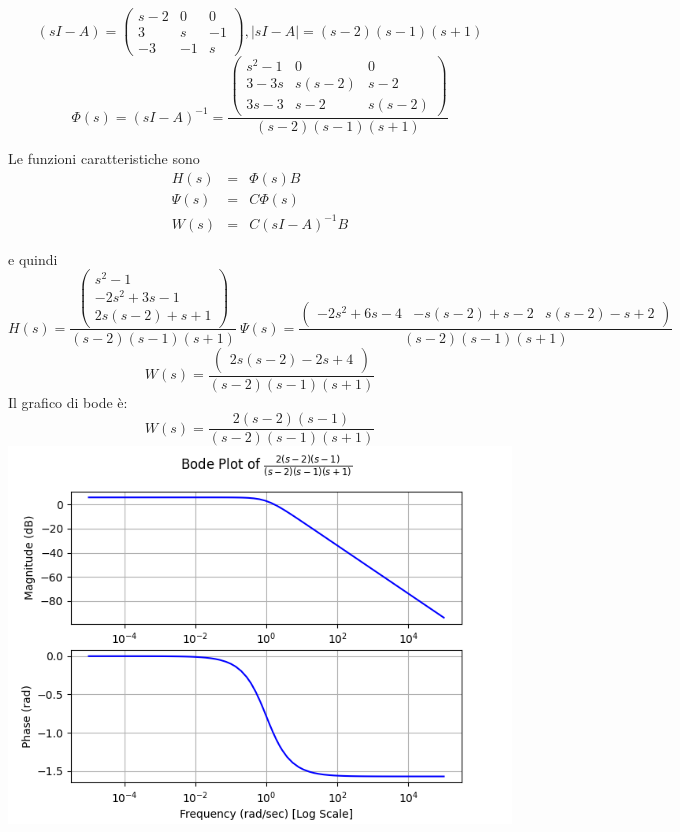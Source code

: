 \documentclass{article}
\begin{document}
\[ (sI-A) = \left(\begin{matrix}s - 2 & 0 & 0\\3 & s & -1\\-3 & -1 & s\end{matrix}\right), |sI-A| = \left(s - 2\right) \left(s - 1\right) \left(s + 1\right) \]
\[ \Phi(s) = (sI-A)^{-1} = \frac{\left(\begin{matrix}s^{2} - 1 & 0 & 0\\3 - 3 s & s \left(s - 2\right) & s - 2\\3 s - 3 & s - 2 & s \left(s - 2\right)\end{matrix}\right)}{\left(s - 2\right) \left(s - 1\right) \left(s + 1\right)} \]

Le funzioni caratteristiche sono \[\begin{array}{rcl}  H(s) & = & \Phi(s)B \\ \Psi(s) & = & C \Phi(s)\\ W(s) & = & C(sI-A)^{-1}B  \end{array} \]

e quindi \[ H(s)  =  \frac{\left(\begin{matrix}s^{2} - 1\\- 2 s^{2} + 3 s - 1\\2 s \left(s - 2\right) + s + 1\end{matrix}\right)}{\left(s - 2\right) \left(s - 1\right) \left(s + 1\right)} \ \Psi(s) = \frac{\left(\begin{matrix}- 2 s^{2} + 6 s - 4 & - s \left(s - 2\right) + s - 2 & s \left(s - 2\right) - s + 2\end{matrix}\right)}{\left(s - 2\right) \left(s - 1\right) \left(s + 1\right)} \]
\[ W(s)  =  \frac{\left(\begin{matrix}2 s \left(s - 2\right) - 2 s + 4\end{matrix}\right)}{\left(s - 2\right) \left(s - 1\right) \left(s + 1\right)}   \] 
Il grafico di bode è:
\[ W(s) = \frac{2 \left(s - 2\right) \left(s - 1\right)}{\left(s - 2\right) \left(s - 1\right) \left(s + 1\right)} \]\includegraphics[scale = 0.5]{figures/bode_5908268.png}
\end{document}
